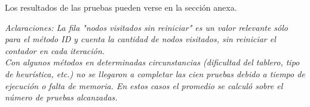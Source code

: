 \documentclass[10pt,journal,compsoc]{IEEEtran}
\begin{document}
Los resultados de las pruebas pueden verse en la secci\'on anexa.

\textit{Aclaraciones: 
La fila "nodos visitados sin reiniciar" es un valor relevante s\'olo para el m\'etodo ID y cuenta la cantidad de nodos visitados, sin reiniciar el contador en cada iteraci\'on.\\
Con algunos m\'etodos en determinadas circunstancias (dificultad del tablero, tipo de heur\'istica, etc.) no se llegaron a completar las cien pruebas debido a tiempo de ejecuci\'on o falta de memoria. En estos casos el promedio se calcul\'o sobre el n\'umero de pruebas alcanzadas.}









%
%
\end{document}
